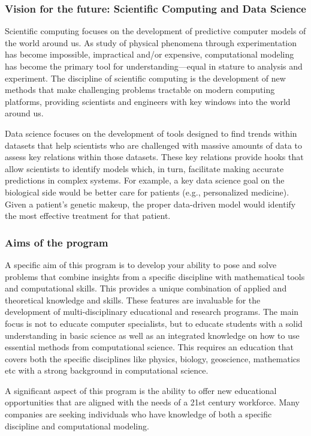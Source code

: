 \documentclass{beamer}
\begin{document}
\begin{frame}
\frametitle{Vision for the future: Scientific Computing and Data Science}

Scientific computing focuses on the development of predictive computer
models of the world around us. As study of physical phenomena through
experimentation has become impossible, impractical and/or expensive,
computational modeling has become the primary tool for
understanding—equal in stature to analysis and experiment. 
The discipline of scientific computing
is the development of new methods that make challenging problems
tractable on modern computing platforms, providing scientists and
engineers with key windows into the world around us.

Data science focuses on the development of tools designed to find
trends within datasets that help scientists who are challenged with
massive amounts of data to assess key relations within those
datasets. These key relations provide hooks that allow scientists to
identify models which, in turn, facilitate making accurate predictions
in complex systems. For example, a key data science goal on the
biological side would be better care for patients (e.g., personalized
medicine). Given a patient’s genetic makeup, the proper data-driven
model would identify the most effective treatment for that patient.
\end{frame}

\begin{frame}
\frametitle{Aims of the program}

A specific aim of this program is to develop your ability to pose and
solve problems that combine  insights from a specific discipline with mathematical tools
and computational skills. This provides a unique combination
of applied and theoretical knowledge and skills. These features are invaluable
for the development of multi-disciplinary educational and research programs.
The main focus is not to educate computer
specialists, but to educate students with a solid understanding in basic science
as well as an integrated knowledge on how  to use
essential methods from computational science. This requires an
education that covers both the specific disciplines like physics, biology,
geoscience, mathematics etc with a strong background in computational science.


A significant aspect of this program is the ability to offer new educational
opportunities that are aligned with the needs of a 21st century
workforce. Many companies are seeking
individuals who have knowledge of both a specific discipline and
computational modeling.
\end{frame}
\end{document}
